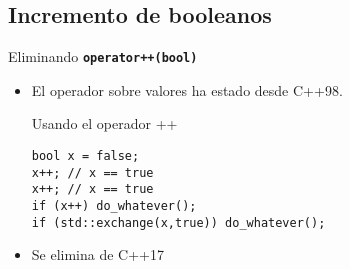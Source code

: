 \subsection{Incremento de booleanos}

\begin{frame}[t,fragile]{Eliminando \textbf{\texttt{operator++(bool)}}}
\begin{itemize}
  \item El operador \cppkey{++} sobre valores  ha estado
         desde C++98.
\vfill
\begin{block}{Usando el operador ++}
\begin{lstlisting}
bool x = false;
x++; // x == true
x++; // x == true
if (x++) do_whatever();
if (std::exchange(x,true)) do_whatever();
\end{lstlisting}
\end{block}
\vfill
  \item Se elimina de C++17
\end{itemize}
\end{frame}
